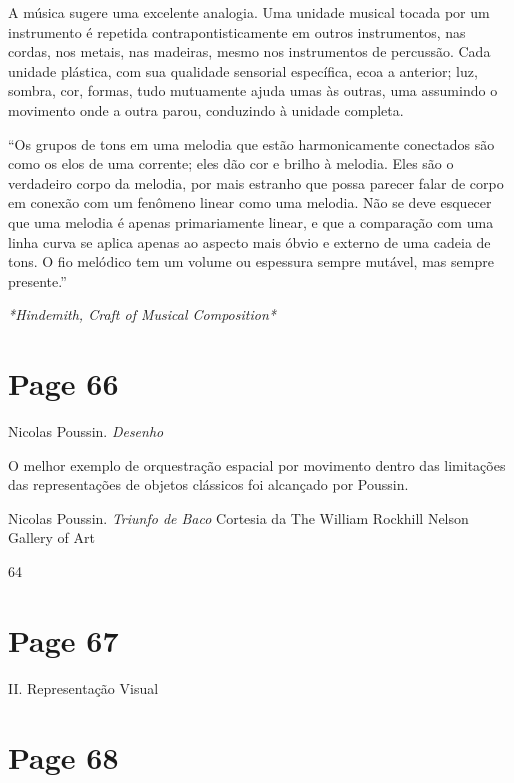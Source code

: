 \documentclass[a4paper]{article}
\begin{document}
A música sugere uma excelente analogia. Uma unidade musical tocada por um instrumento é repetida contrapontisticamente em outros instrumentos, nas cordas, nos metais, nas madeiras, mesmo nos instrumentos de percussão. Cada unidade plástica, com sua qualidade sensorial específica, ecoa a anterior; luz, sombra, cor, formas, tudo mutuamente ajuda umas às outras, uma assumindo o movimento onde a outra parou, conduzindo à unidade completa.

``Os grupos de tons em uma melodia que estão harmonicamente conectados são como os elos de uma corrente; eles dão cor e brilho à melodia. Eles são o verdadeiro corpo da melodia, por mais estranho que possa parecer falar de corpo em conexão com um fenômeno linear como uma melodia. Não se deve esquecer que uma melodia é apenas primariamente linear, e que a comparação com uma linha curva se aplica apenas ao aspecto mais óbvio e externo de uma cadeia de tons. O fio melódico tem um volume ou espessura sempre mutável, mas sempre presente.''

\textit{*Hindemith, Craft of Musical Composition*}

\vfill
{}

\newpage
\section*{Page 66}

Nicolas Poussin. \textit{Desenho}

O melhor exemplo de orquestração espacial por movimento dentro das limitações das representações de objetos clássicos foi alcançado por Poussin.

Nicolas Poussin. \textit{Triunfo de Baco}
Cortesia da The William Rockhill Nelson Gallery of Art

\vspace*{\fill}
\begin{center}
64
\end{center}

\newpage
\section*{Page 67}

\begin{center}
II. Representação Visual
\end{center}

\newpage
\section*{Page 68}
\end{document}
